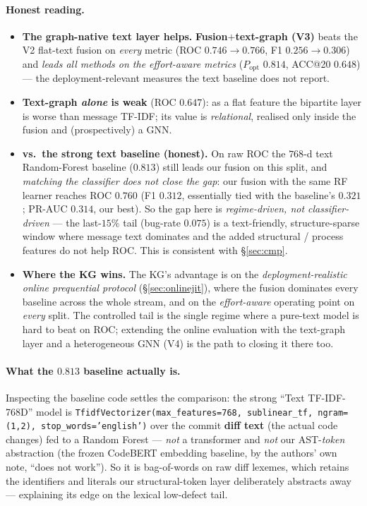 \documentclass[11pt,a4paper]{article}
\begin{document}
	\paragraph{Honest reading.}
	\begin{itemize}[nosep]
		\item \textbf{The graph-native text layer helps.} \textbf{Fusion$+$text-graph
		(V3)} beats the V2 flat-text fusion on \emph{every} metric (ROC
		$0.746\!\rightarrow\!0.766$, F1 $0.256\!\rightarrow\!0.306$) and \emph{leads all
		methods on the effort-aware metrics} ($P_{\mathrm{opt}}$ $0.814$, ACC@20 $0.648$)
		--- the deployment-relevant measures the text baseline does not report.
		\item \textbf{Text-graph \emph{alone} is weak} (ROC $0.647$): as a flat feature the
		bipartite layer is worse than message TF-IDF; its value is \emph{relational},
		realised only inside the fusion and (prospectively) a GNN.
		\item \textbf{vs.\ the strong text baseline (honest).} On raw ROC the $768$-d
		text Random-Forest baseline ($0.813$) still leads our fusion on this split, and
		\emph{matching the classifier does not close the gap}: our fusion with the same
		RF learner reaches ROC $0.760$ (F1 $0.312$, essentially tied with the baseline's
		$0.321$; PR-AUC $0.314$, our best). So the gap here is \emph{regime-driven, not
		classifier-driven} --- the last-$15\%$ tail (bug-rate $0.075$) is a text-friendly,
		structure-sparse window where message text dominates and the added structural /
		process features do not help ROC. This is consistent with \S\ref{sec:cmp}.
		\item \textbf{Where the KG wins.} The KG's advantage is on the
		\emph{deployment-realistic online prequential protocol} (\S\ref{sec:onlinejit}),
		where the fusion dominates every baseline across the whole stream, and on the
		\emph{effort-aware} operating point on \emph{every} split. The controlled tail is
		the single regime where a pure-text model is hard to beat on ROC; extending the
		online evaluation with the text-graph layer and a heterogeneous GNN (V4) is the
		path to closing it there too.
	\end{itemize}

	\paragraph{What the $0.813$ baseline actually is.} Inspecting the baseline code
	settles the comparison: the strong ``Text TF-IDF-768D'' model is
	\texttt{TfidfVectorizer(max\_features=768, sublinear\_tf, ngram=(1,2),
	stop\_words='english')} over the commit \textbf{diff text} (the actual code
	changes) fed to a Random Forest --- \emph{not} a transformer and \emph{not} our
	AST-\emph{token} abstraction (the frozen CodeBERT embedding baseline, by the
	authors' own note, ``does not work''). So it is bag-of-words on raw diff lexemes,
	which retains the identifiers and literals our structural-token layer deliberately
	abstracts away --- explaining its edge on the lexical low-defect tail.
\end{document}
